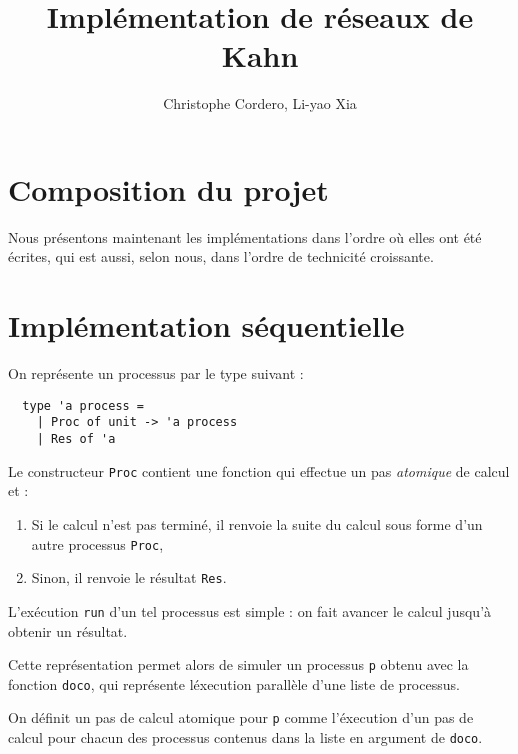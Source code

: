 \documentclass[11pt]{article}
\begin{document}
\title{Impl\'ementation de r\'eseaux de Kahn}

\author{Christophe Cordero, Li-yao Xia}

\maketitle

\section{Composition du projet}

Nous pr\'esentons maintenant les impl\'ementations dans l'ordre
o\`u elles ont \'et\'e \'ecrites, qui est aussi, selon nous, dans l'ordre de technicit\'e croissante.

\section{Impl\'ementation s\'equentielle}

On repr\'esente un processus par le type suivant :

\begin{lstlisting}
  type 'a process =
    | Proc of unit -> 'a process
    | Res of 'a
\end{lstlisting}

Le constructeur {\tt Proc} contient une fonction qui effectue
un pas {\em atomique} de calcul et :

\begin{enumerate}
  \item Si le calcul n'est pas termin\'e,
    il renvoie la suite du calcul sous forme d'un autre processus {\tt Proc},
  \item Sinon, il renvoie le r\'esultat {\tt Res}.
\end{enumerate}

L'ex\'ecution {\tt run} d'un tel processus est simple :
on fait avancer le calcul jusqu'\`a obtenir un r\'esultat.

\smallskip

Cette repr\'esentation permet alors de simuler un processus {\tt p}
obtenu avec la fonction {\tt doco}, qui repr\'esente l\'execution
parall\`ele d'une liste de processus.

On d\'efinit un pas de calcul atomique pour {\tt p}
comme l'\'execution d'un pas de calcul pour chacun des processus
contenus dans la liste en argument de {\tt doco}.

\smallskip
\end{document}
